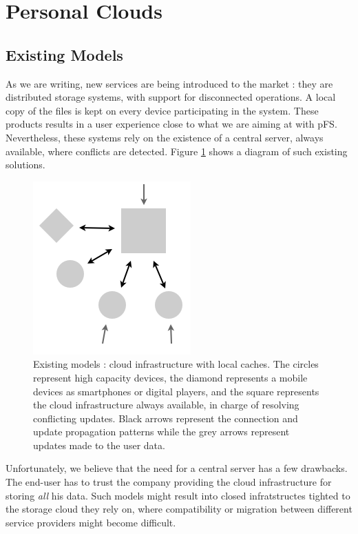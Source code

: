 
\section{Personal Clouds}
\label{sec:model}

\subsection {Existing Models}

As we are writing, new services are being introduced to the
market : they are distributed storage systems, with support for
disconnected operations. A local copy of the files is kept on every
device participating in the system. These products results in a user
experience close to what we are aiming at with pFS. Nevertheless, these
systems rely on the existence of a central server, always available,
where conflicts are detected. Figure \ref{OthModel} shows a diagram of
such existing solutions.

\begin{figure}[ht]
\begin{center}
  \includegraphics [scale=0.4] {img/other_model}
  \caption{\label{OthModel}
    {\small Existing models : cloud infrastructure with local
      caches. The circles represent high capacity devices, the diamond
      represents a mobile devices as smartphones or digital players,
      and the square represents the cloud infrastructure always
      available, in charge of resolving conflicting updates. Black
      arrows represent the connection and update propagation patterns
      while the grey arrows represent updates made to the user data.}}
\end{center}
\end{figure}

Unfortunately, we believe that the need for a central server has a few
drawbacks. The end-user has to trust the company providing the cloud
infrastructure for storing \emph{all} his data. Such models might
result into closed infratstructes tighted to the storage cloud
they rely on, where compatibility or migration between different
service providers might become difficult.

